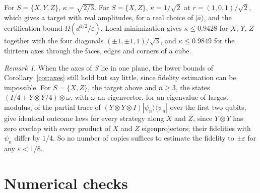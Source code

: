 \documentclass[11pt]{article}
\theoremstyle{remark}
\newtheorem{remark}[theorem]{Remark}
\newcommand{\eps}{\varepsilon}
\newcommand{\ket}[1]{|#1\rangle}
\newcommand{\bra}[1]{\langle #1|}
\newcommand{\abar}{\bar a}
\begin{document}
For $S = \{X,Y,Z\}$, $\kappa = \sqrt{2/3}$. For $S = \{X,Z\}$, $\kappa = 1/\sqrt2$ at $r = (1,0,1)/\sqrt2$, which gives a target with real amplitudes, for a real choice of $\ket\abar$, and the certification bound $\Omega(d^{1/2}/\eps)$. Local minimization gives $\kappa\le0.9428$ for $X$, $Y$, $Z$ together with the four diagonals $(\pm1,\pm1,1)/\sqrt3$, and $\kappa\le0.9849$ for the thirteen axes through the faces, edges and corners of a cube.

\begin{remark}
When the axes of $S$ lie in one plane, the lower bounds of Corollary~\ref{cor:axes} still hold but say little, since fidelity estimation can be impossible. For $S = \{X,Z\}$, the target above and $n\ge3$, the states $(I/4\pm Y\otimes Y/4)\otimes\omega$, with $\omega$ an eigenvector, for an eigenvalue of largest modulus, of the partial trace of $(Y\otimes Y\otimes I)\ket{\psi_n}\bra{\psi_n}$ over the first two qubits, give identical outcome laws for every strategy along $X$ and $Z$, since $Y\otimes Y$ has zero overlap with every product of $X$ and $Z$ eigenprojectors; their fidelities with $\psi_n$ differ by $1/4$. So no number of copies suffices to estimate the fidelity to $\pm\eps$ for any $\eps<1/8$.
\end{remark}

\section{Numerical checks}\label{sec:num}
\end{document}
